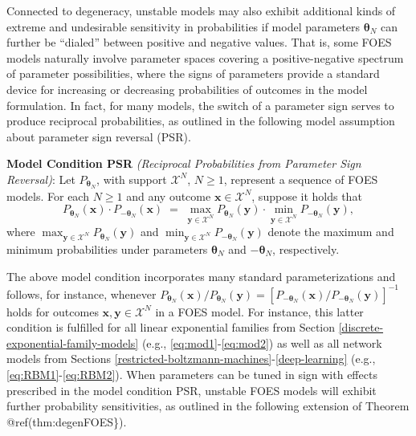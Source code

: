 \documentclass[12pt]{article}
\theoremstyle{definition}
\begin{document}
Connected to degeneracy, unstable models may also exhibit additional
kinds of extreme and undesirable sensitivity in probabilities if model
parameters \(\boldsymbol \theta_N\) can further be ``dialed'' between
positive and negative values. That is, some FOES models naturally
involve parameter spaces covering a positive-negative spectrum of
parameter possibilities, where the signs of parameters provide a
standard device for increasing or decreasing probabilities of outcomes
in the model formulation. In fact, for many models, the switch of a
parameter sign serves to produce reciprocal probabilities, as outlined
in the following model assumption about parameter sign reversal (PSR).

\textbf{Model Condition PSR} \emph{(Reciprocal Probabilities from
Parameter Sign Reversal)}: Let \(P_{\boldsymbol \theta_N}\), with
support \(\mathcal{X}^N\), \(N\geq 1\), represent a sequence of FOES
models. For each \(N \geq 1\) and any outcome
\(\boldsymbol x \in \mathcal{X}^N\), suppose it holds that \[
P_{\boldsymbol \theta_N}(\boldsymbol x)  \cdot P_{-\boldsymbol \theta_N}(\boldsymbol x) \;=\;   \max\limits_{\boldsymbol y \in \mathcal{X}^N}P_{ \boldsymbol \theta_N}(\boldsymbol y)\cdot \min\limits_{\boldsymbol y \in \mathcal{X}^N}P_{-\boldsymbol \theta_N}(\boldsymbol y),
\] where
\(\max_{\boldsymbol y \in \mathcal{X}^N}P_{ \boldsymbol \theta_N}(\boldsymbol y)\)
and
\(\min_{\boldsymbol y \in \mathcal{X}^N}P_{-\boldsymbol \theta_N}(\boldsymbol y)\)
denote the maximum and minimum probabilities under parameters
\(\boldsymbol \theta_N\) and \(-\boldsymbol \theta_N\), respectively.

The above model condition incorporates many standard parameterizations
and follows, for instance, whenever
\(P_{\boldsymbol \theta_N}(\boldsymbol x)/P_{\boldsymbol \theta_N}(\boldsymbol y) = [P_{-\boldsymbol \theta_N}(\boldsymbol x)/P_{-\boldsymbol \theta_N}(\boldsymbol y)]^{-1}\)
holds for outcomes \(\boldsymbol x, \boldsymbol y \in\mathcal{X}^N\) in
a FOES model. For instance, this latter condition is fulfilled for all
linear exponential families from Section
\ref{discrete-exponential-family-models} (e.g.,
\eqref{eq:mod1}-\eqref{eq:mod2}) as well as all network models from Sections
\ref{restricted-boltzmann-machines}-\ref{deep-learning} (e.g.,
\eqref{eq:RBM1}-\eqref{eq:RBM2}). When parameters can be tuned in sign with
effects prescribed in the model condition PSR, unstable FOES models will
exhibit further probability sensitivities, as outlined in the following
extension of Theorem @ref(thm:degenFOES\}).
\end{document}
